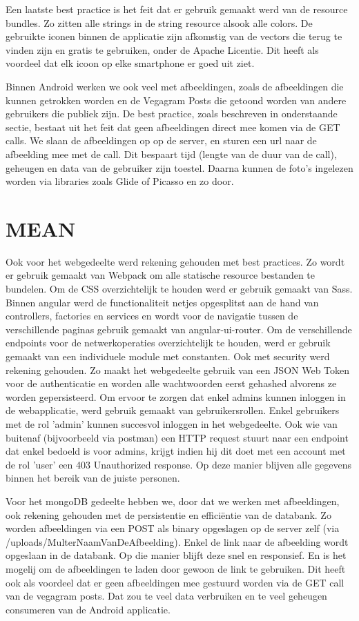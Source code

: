 Een laatste best practice is het feit dat er gebruik gemaakt werd van de resource bundles. Zo zitten alle strings in de string resource alsook alle colors. De gebruikte iconen binnen de applicatie zijn afkomstig van de vectors die terug te vinden zijn en gratis te gebruiken, onder de Apache Licentie. Dit heeft als voordeel dat elk icoon op elke smartphone er goed uit ziet.

Binnen Android werken we ook veel met afbeeldingen, zoals de afbeeldingen die kunnen getrokken worden en de Vegagram Posts die getoond worden van andere gebruikers die publiek zijn. De best practice, zoals beschreven in onderstaande sectie, bestaat uit het feit dat geen afbeeldingen direct mee komen via de GET calls. We slaan de afbeeldingen op op de server, en sturen een url naar de afbeelding mee met de call. Dit bespaart tijd (lengte van de duur van de call), geheugen en data van de gebruiker zijn toestel. Daarna kunnen de foto's ingelezen worden via libraries zoals Glide of Picasso en zo door.

\section{MEAN}

Ook voor het webgedeelte werd rekening gehouden met best practices. Zo wordt er gebruik gemaakt van Webpack om alle statische resource bestanden te bundelen. Om de CSS overzichtelijk te houden werd er gebruik gemaakt van Sass. Binnen angular werd de functionaliteit netjes opgesplitst aan de hand van controllers, factories en services en wordt voor de navigatie tussen de verschillende paginas gebruik gemaakt van angular-ui-router. 
Om de verschillende endpoints voor de netwerkoperaties overzichtelijk te houden, werd er gebruik gemaakt van een 
individuele module met constanten. Ook met security werd rekening gehouden. Zo maakt het webgedeelte gebruik van een JSON Web Token 
voor de authenticatie en worden alle wachtwoorden eerst gehashed alvorens ze worden gepersisteerd.
Om ervoor te zorgen dat enkel admins kunnen inloggen in de webapplicatie, werd gebruik gemaakt van gebruikersrollen.
Enkel gebruikers met de rol 'admin' kunnen succesvol inloggen in het webgedeelte. Ook wie van buitenaf (bijvoorbeeld via postman) een 
HTTP request stuurt naar een endpoint dat enkel bedoeld is voor admins, krijgt indien hij dit doet met een account met de rol 'user' een
403 Unauthorized response. Op deze manier blijven alle gegevens binnen het bereik van de juiste personen.

Voor het mongoDB gedeelte hebben we, door dat we werken met afbeeldingen, ook rekening gehouden met de persistentie en efficiëntie van de databank. Zo worden afbeeldingen via een POST als binary opgeslagen op de server zelf (via /uploads/MulterNaamVanDeAfbeelding). Enkel de link naar de afbeelding wordt opgeslaan in de databank. Op die manier blijft deze snel en responsief. En is het mogelij om de afbeeldingen te laden door gewoon de link te gebruiken. Dit heeft ook als voordeel dat er geen afbeeldingen mee gestuurd worden via de GET call van de vegagram posts. Dat zou te veel data verbruiken en te veel geheugen consumeren van de Android applicatie.